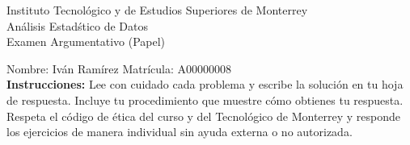 \documentclass[10pt]{report}
\begin{document}
\newpage



\begin{center}
{\large Instituto Tecnol\'{o}gico y de Estudios Superiores de Monterrey \\
An\'alisis Estad\'stico de Datos } \\
Examen Argumentativo (Papel)
\end{center}

Nombre: \underline{\hspace*{.2in}}
Iván Ramírez
\underline{\hspace*{.2in}} \quad Matr\'icula:\underline{\hspace*{.2in}}
A00000008
\underline{\hspace*{.2in}} \\

{\bf Instrucciones:} Lee con cuidado cada problema y escribe la soluci\'on
en tu hoja de respuesta. Incluye tu procedimiento que muestre c\'omo obtienes tu respuesta.  Respeta el c\'odigo de \'etica del curso y del Tecnol\'ogico de Monterrey y responde los ejercicios de manera individual sin ayuda externa o no autorizada.
\end{document}
